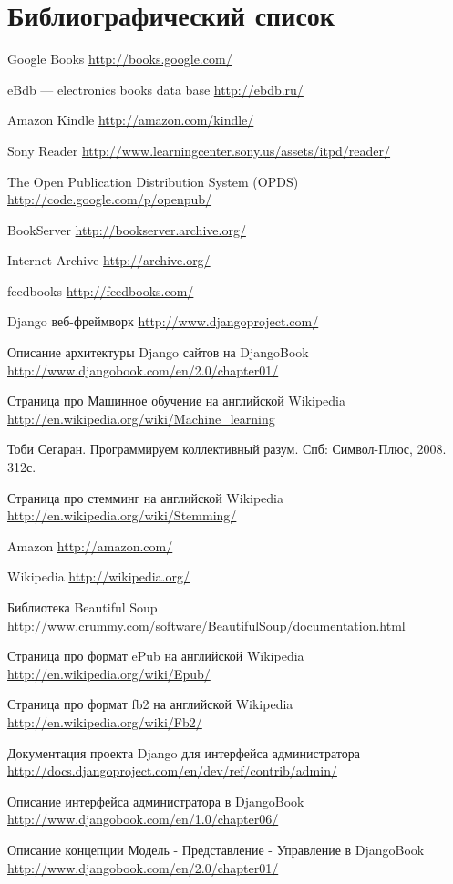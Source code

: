 \cleardoublepage
\section{Библиографический список}
 
\renewcommand*{\refname}{}
\begin{thebibliography}{99}

 Google Books \url{http://books.google.com/}

 eBdb --- electronics books data base \url{http://ebdb.ru/}

 Amazon Kindle \url{http://amazon.com/kindle/}

 Sony Reader \url{http://www.learningcenter.sony.us/assets/itpd/reader/}

 The Open Publication Distribution System (OPDS) \url{http://code.google.com/p/openpub/}

 BookServer \url{http://bookserver.archive.org/}

 Internet Archive \url{http://archive.org/}

 feedbooks \url{http://feedbooks.com/}

 Django веб-фреймворк \url{http://www.djangoproject.com/}

 Описание архитектуры Django сайтов на DjangoBook \url{http://www.djangobook.com/en/2.0/chapter01/}

 Страница про Машинное обучение на английской Wikipedia \url{http://en.wikipedia.org/wiki/Machine_learning}

 Тоби Сегаран. Программируем коллективный разум. Спб: Символ-Плюс, 2008. 312с.

 Страница про стемминг на английской Wikipedia \url{http://en.wikipedia.org/wiki/Stemming/}

 Amazon \url{http://amazon.com/}

 Wikipedia \url{http://wikipedia.org/}

 Библиотека Beautiful Soup \\ \url{http://www.crummy.com/software/BeautifulSoup/documentation.html}

 Страница про формат ePub на английской Wikipedia \url{http://en.wikipedia.org/wiki/Epub/}

 Страница про формат fb2 на английской Wikipedia \url{http://en.wikipedia.org/wiki/Fb2/}

 Документация проекта Django для интерфейса администратора \url{http://docs.djangoproject.com/en/dev/ref/contrib/admin/}

 Описание интерфейса администратора в DjangoBook \url{http://www.djangobook.com/en/1.0/chapter06/}

 Описание концепции Модель - Представление - Управление в DjangoBook
\url{http://www.djangobook.com/en/2.0/chapter01/}
\end{thebibliography}
